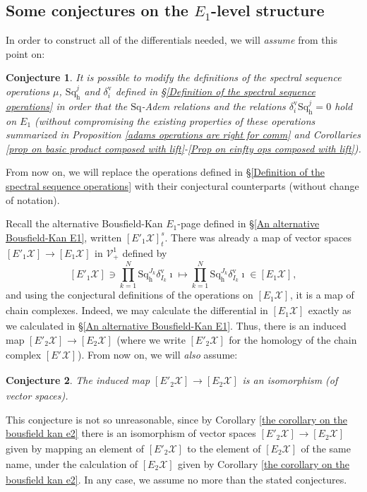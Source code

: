 \documentclass[11pt]{amsart} \renewcommand{\baselinestretch}{1.2}
\theoremstyle{plain}
\newtheorem{conjecture}{Conjecture}
\numberwithin{equation}{section} %
\theoremstyle{plain}
\newtheorem{conjecture}{Conjecture}
\numberwithin{equation}{chapter} %
\renewcommand{\to}{\longrightarrow}
\newcommand{\calV}{\mathcal{V}}
\newcommand{\calx}{\mathcal{X}}
\newcommand{\vect}[2]{\calV^{#1}_{#2}}
\newcommand{\Sq}{\mathrm{Sq}}
\newcommand{\Eprime}[5]{[E'_{#2}#3]^{#4}_{#5}}
\newcommand{\E}[5]{[E^{#1}_{#2}#3]^{#4}_{#5}}
\newcommand{\uver}{^\mathrm{v}}
\newcommand{\dhor}{_\mathrm{h}}
\newcommand{\Sqh}{\mathrm{Sq}\dhor}
\newcommand{\deltav}{\delta\uver}
\renewcommand{\mapsto}{\longmapsto}
\newcommand{\SubsectionOrSection}[1]{\subsection{#1}}
\begin{document}
\begin{The Bousfield-Kan spectral sequence for a sphere}
\SubsectionOrSection{Some conjectures on the $E_1$-level structure}
\label{Some conjectures on the E1-level structure}
In order to construct all of the differentials needed, we will \emph{assume} from this point on:
\begin{conjecture}
\label{conjec1}
It is possible to modify the definitions of the spectral sequence operations $\mu$, $\Sqh^j$ and $\deltav_i$ defined in \S\ref{Definition of the spectral sequence operations} in order that the $\Sq$-Adem relations and the relations $\deltav_i\Sqh^j=0$ hold on $E_1$ (without compromising the existing properties of these operations summarized in Proposition \ref{adams operations are right for comm} and Corollaries \ref{prop on basic product composed with lift}-\ref{Prop on einfty ops composed with lift}).
\end{conjecture}
\noindent From now on, we will replace the operations defined in \S\ref{Definition of the spectral sequence operations} with their conjectural counterparts (without change of notation).

Recall the alternative Bousfield-Kan $E_1$-page defined in \S\ref{An alternative Bousfield-Kan E1}, written $\Eprime{blank}{1}{\calx}{s}{t}$. There was already a map of vector spaces $\Eprime{blank}{1}{\calx}{}{}\to \E{}{1}{\calx}{}{}$  in $\vect{1}{+}$ defined by
\[\Eprime{blank}{1}{\calx}{}{}\ni \textstyle\prod_{k=1}^N\Sqh^{J_k}\deltav_{I_k}\imath\mapsto \textstyle\prod_{k=1}^N\Sqh^{J_k}\deltav_{I_k}\imath\in \E{}{1}{\calx}{}{},\]
and using the conjectural definitions of the operations on  $\E{}{1}{\calx}{}{}$, it is a map of chain complexes. Indeed, we may calculate the differential in $\E{}{1}{\calx}{}{}$ exactly as we calculated in \S\ref{An alternative Bousfield-Kan E1}. Thus, there is an induced map $\Eprime{blank}{2}{\calx}{}{}\to \E{}{2}{\calx}{}{}$ (where we write $\Eprime{blank}{2}{\calx}{}{}$ for the homology of the chain complex $\Eprime{blank}{}{\calx}{}{}$). From now on, we will \emph{also} assume:
\begin{conjecture}
\label{conjec2}
The induced map $\Eprime{blank}{2}{\calx}{}{}\to \E{}{2}{\calx}{}{}$ is an isomorphism (of vector spaces).
\end{conjecture}
\noindent This conjecture is not so unreasonable, since by Corollary \ref{the corollary on the bousfield kan e2} there is an isomorphism of vector spaces $\Eprime{blank}{2}{\calx}{}{}\to \E{}{2}{\calx}{}{}$ given by mapping an element of $\Eprime{blank}{2}{\calx}{}{}$ to the element of $\E{}{2}{\calx}{}{}$ of the same name, under the calculation of $\E{}{2}{\calx}{}{}$ given by Corollary \ref{the corollary on the bousfield kan e2}. In any case, we assume no more than the stated conjectures.


\end{The Bousfield-Kan spectral sequence for a sphere}
\end{document}
